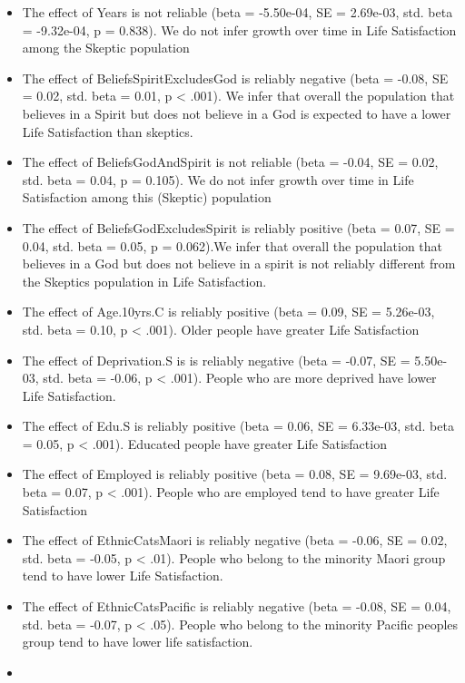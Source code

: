 \documentclass[
  english,
  man]{apa6}
\providecommand{\tightlist}{%
  \setlength{\itemsep}{0pt}\setlength{\parskip}{0pt}}
\begin{document}
\begin{itemize}
\tightlist
\item
  The effect of Years is not reliable (beta = -5.50e-04, SE = 2.69e-03, std. beta = -9.32e-04, p = 0.838). We do not infer growth over time in Life Satisfaction among the Skeptic population
\item
  The effect of BeliefsSpiritExcludesGod is reliably negative (beta = -0.08, SE = 0.02, std. beta = 0.01, p \textless{} .001). We infer that overall the population that believes in a Spirit but does not believe in a God is expected to have a lower Life Satisfaction than skeptics.
\item
  The effect of BeliefsGodAndSpirit is not reliable (beta = -0.04, SE = 0.02, std. beta = 0.04, p = 0.105). We do not infer growth over time in Life Satisfaction among this (Skeptic) population
\item
  The effect of BeliefsGodExcludesSpirit is reliably positive (beta = 0.07, SE = 0.04, std. beta = 0.05, p = 0.062).We infer that overall the population that believes in a God but does not believe in a spirit is not reliably different from the Skeptics population in Life Satisfaction.
\item
  The effect of Age.10yrs.C is reliably positive (beta = 0.09, SE = 5.26e-03, std. beta = 0.10, p \textless{} .001). Older people have greater Life Satisfaction
\item
  The effect of Deprivation.S is is reliably negative (beta = -0.07, SE = 5.50e-03, std. beta = -0.06, p \textless{} .001). People who are more deprived have lower Life Satisfaction.
\item
  The effect of Edu.S is reliably positive (beta = 0.06, SE = 6.33e-03, std. beta = 0.05, p \textless{} .001). Educated people have greater Life Satisfaction
\item
  The effect of Employed is reliably positive (beta = 0.08, SE = 9.69e-03, std. beta = 0.07, p \textless{} .001). People who are employed tend to have greater Life Satisfaction
\item
  The effect of EthnicCatsMaori is reliably negative (beta = -0.06, SE = 0.02, std. beta = -0.05, p \textless{} .01). People who belong to the minority Maori group tend to have lower Life Satisfaction.
\item
  The effect of EthnicCatsPacific is reliably negative (beta = -0.08, SE = 0.04, std. beta = -0.07, p \textless{} .05). People who belong to the minority Pacific peoples group tend to have lower life satisfaction.
\item

\end{itemize}
\end{document}
